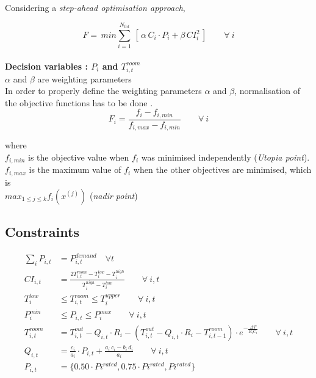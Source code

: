 \documentclass[12pt,a4paper]{article}
\begin{document}
Considering a \emph{step-ahead optimisation approach},

\begin{equation}
    F =\, min \sum_{i=1}^{N_{tot}}\, [\,\alpha \, C_{i}\cdot P_{i} + \beta\, CI_{i}^2\,] \quad \quad \forall \: i
\end{equation}
\\

\textbf{Decision variables : $P_{i}$ and $T_{i,t}^{room}$}\\

$\alpha$ and $\beta$ are weighting parameters \\

In order to properly define the weighting parameters $\alpha$ and $\beta$, normalisation of the objective functions has to be done \cite{Marler2010}.
\begin{equation}
    F_{i} = \frac{f_{i}- f_{i,min}}{f_{i,max}-f_{i,min}} \quad \quad  \forall \:i
\end{equation}

where \\

$f_{i,min}$ is the objective value when $f_{i}$ was minimised independently (\emph{Utopia point}). \\

$f_{i,max}$ is the maximum value of $f_{i}$ when the other objectives are minimised, which is\\  
$max_{1\leq j \leq k } f_{i}(x^{(j)})$ (\emph{nadir point})

\subsection*{\small Constraints}
\begin{align}
    \label{eq: power_balance}
    \sum\limits_{i} P_{i,t} &= P_{i,t}^{demand} \quad \forall t \\
     \label{eq: CI_intro}
    CI_{i,t} &= \frac{2T_{i,t}^{room}- T_{i}^{low}-T_{i}^{high}}{T_{i}^{high}-T_{i}^{low}} \quad \quad \forall \: i,t\\
     \label{eq: Temp_limits}
    T_{i}^{low} &\leq T_{i,t}^{room} \leq  T_{i}^{upper}\quad \quad \forall \: i,t \\
    \label{eq: Power_limits}
    P_{i}^{min} &\leq P_{i,t} \leq  P_{i}^{max}  \quad \quad \forall \: i,t \\
     \label{eq: Indoor_temp_model}
    T_{i,t}^{room} &= T_{i,t}^{out} - Q_{i,t}\cdot R_{i} - (T_{i,t}^{out} - Q_{i,t}\cdot R_{i}
    - T_{i,t-1}^{room})\cdot e^{-\frac{\Delta T}{R_{i}C_{i}}}  \quad \quad \forall \: i,t\\
    \label{eq: Inverter_AC_model}
    Q_{i,t} &= \frac{c_{i}}{a_{i}}\cdot P_{i,t} + \frac{a_{i}\, c_{i}- b_{i}\, d_{i}}{a_{i}} \quad \quad \forall \: i,t \\
    \label{eq: power_levels_for_apps}
    P_{i,t} &= \{0.50\cdot P{i}^{rated}, 0.75\cdot P{i}^{rated}, P{i}^{rated} \}
  \end{align}
  
\end{document}
